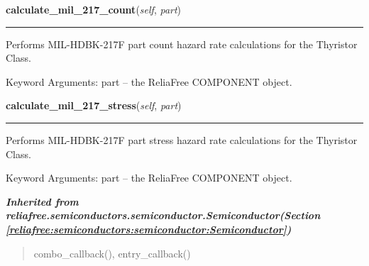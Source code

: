 \hspace{.8\funcindent}\begin{boxedminipage}{\funcwidth}

    \raggedright \textbf{calculate\_mil\_217\_count}(\textit{self}, \textit{part})

    \vspace{-1.5ex}

    \rule{\textwidth}{0.5\fboxrule}
\setlength{\parskip}{2ex}
    Performs MIL-HDBK-217F part count hazard rate calculations for the 
    Thyristor Class.

    Keyword Arguments: part -- the ReliaFree COMPONENT object.

\setlength{\parskip}{1ex}
    \end{boxedminipage}

    \label{reliafree:semiconductors:thyristor:Thyristor:calculate_mil_217_stress}

    \vspace{0.5ex}

\hspace{.8\funcindent}\begin{boxedminipage}{\funcwidth}

    \raggedright \textbf{calculate\_mil\_217\_stress}(\textit{self}, \textit{part})

    \vspace{-1.5ex}

    \rule{\textwidth}{0.5\fboxrule}
\setlength{\parskip}{2ex}
    Performs MIL-HDBK-217F part stress hazard rate calculations for the 
    Thyristor Class.

    Keyword Arguments: part -- the ReliaFree COMPONENT object.

\setlength{\parskip}{1ex}
    \end{boxedminipage}


\large{\textbf{\textit{Inherited from reliafree.semiconductors.semiconductor.Semiconductor\textit{(Section \ref{reliafree:semiconductors:semiconductor:Semiconductor})}}}}

\begin{quote}
combo\_callback(), entry\_callback()
\end{quote}
